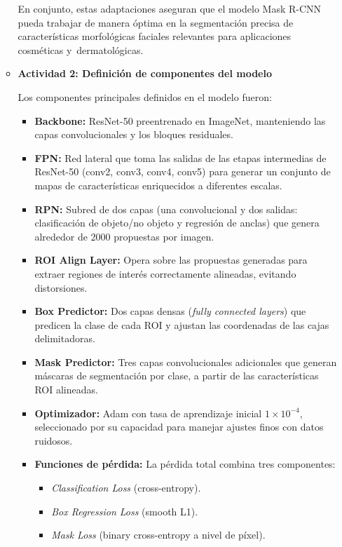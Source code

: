 \begin{enumerate}
\begin{itemize}
\vspace{0.5cm}


En conjunto, estas adaptaciones aseguran que el modelo Mask R-CNN pueda trabajar de manera óptima en la segmentación precisa de características morfológicas faciales relevantes para aplicaciones cosméticas y dermatológicas.
  \item\textbf{Actividad 2: Definición de componentes del modelo}
  
Los componentes principales definidos en el modelo fueron:

\begin{itemize}
    \item \textbf{Backbone:} ResNet-50 preentrenado en ImageNet, manteniendo las capas convolucionales y los bloques residuales. 
    
    \item \textbf{FPN:} Red lateral que toma las salidas de las etapas intermedias de ResNet-50 (conv2, conv3, conv4, conv5) para generar un conjunto de mapas de características enriquecidos a diferentes escalas.
    
    \item \textbf{RPN:} Subred de dos capas (una convolucional y dos salidas: clasificación de objeto/no objeto y regresión de anclas) que genera alrededor de 2000 propuestas por imagen.
    
    \item \textbf{ROI Align Layer:} Opera sobre las propuestas generadas para extraer regiones de interés correctamente alineadas, evitando distorsiones.
    
    \item \textbf{Box Predictor:} Dos capas densas (\textit{fully connected layers}) que predicen la clase de cada ROI y ajustan las coordenadas de las cajas delimitadoras.
    
    \item \textbf{Mask Predictor:} Tres capas convolucionales adicionales que generan máscaras de segmentación por clase, a partir de las características ROI alineadas.
    
    \item \textbf{Optimizador:} Adam con tasa de aprendizaje inicial $1 \times 10^{-4}$, seleccionado por su capacidad para manejar ajustes finos con datos ruidosos.
    
    \item \textbf{Funciones de pérdida:} La pérdida total combina tres componentes: 
    \begin{itemize}
        \item \textit{Classification Loss} (cross-entropy).
        \item \textit{Box Regression Loss} (smooth L1).
        \item \textit{Mask Loss} (binary cross-entropy a nivel de píxel).
    \end{itemize}
\end{itemize}


\end{itemize}
\end{enumerate}
